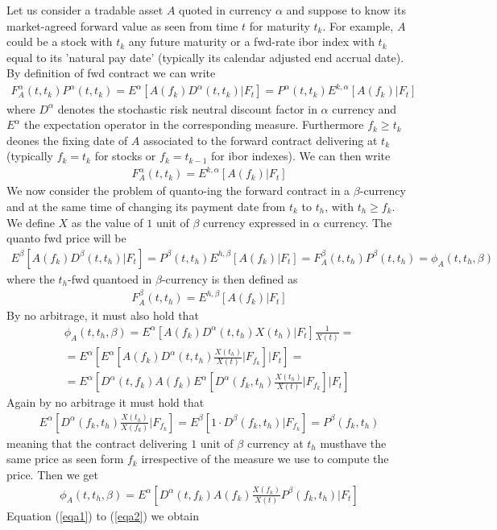 \documentclass[a4paper,10pt]{report}
\theoremstyle{plain}
\theoremstyle{definition}
\newcommand\be{\begin{eqnarray}}    %
\newcommand\ee{\end{eqnarray}}
\begin{document}
Let us consider a tradable asset $A$ quoted in currency $\alpha$ and suppose to know its market-agreed forward value as seen from time $t$ for maturity $t_k$. For example, $A$ could be a stock with $t_k$ any future maturity or a fwd-rate ibor index with $t_k$ equal to its 'natural pay date' (typically its calendar adjusted end accrual date). 
By definition of fwd contract we can write 
\be 
F_A^{\alpha}(t,t_k)P^{\alpha}(t,t_k) = E^{\alpha}\left[A(f_k) D^{\alpha}(t,t_k)| F_t\right]= P^{\alpha}(t,t_k) E^{k, \alpha}\left[A(f_k)| F_t\right]
\ee
where $D^{\alpha}$ denotes the stochastic risk neutral discount factor in $\alpha$ currency and $E^{\alpha}$ the expectation operator in the corresponding measure. 
Furthermore $f_k\ge t_k$ deones the fixing date of $A$ associated to the forward contract delivering at $t_k$ (typically $f_k=t_k$ for stocks or $f_k=t_{k-1}$ for ibor indexes). 
We can then write
\be 
F_A^{\alpha}(t,t_k) = E^{k, \alpha}\left[A(f_k)| F_t\right]
\ee
We now consider the problem of quanto-ing the forward contract in a $\beta$-currency and at the same time of changing its payment date from $t_k$ to $t_h$, with $t_h\ge f_k$. 
We define $X$ as the value of $1$ unit of $\beta$ currency expressed in $\alpha$ currency. The quanto fwd price will be
\be 
E^{\beta}\left[A(f_k) D^{\beta}(t,t_h)| F_t\right] =P^{\beta}(t,t_h) E^{h, \beta}\left[A(f_k)| F_t\right]=F_A^{\beta}(t,t_h)P^{\beta}(t,t_h)=\phi_A(t,t_h,\beta)
\label{eqa1}
\ee
where the $t_h$-fwd quantoed in $\beta$-currency is then defined as
\be 
F_A^{\beta}(t,t_h) = E^{h, \beta}\left[A(f_k)| F_t\right]
\ee
By no arbitrage, it must also hold that
\be 
\phi_A(t,t_h,\beta)=E^{\alpha}\left[A(f_k) D^{\alpha}(t,t_h) X(t_h) | F_t\right] \frac{1}{X(t)}=\\
= E^{\alpha}\left[E^{\alpha}\left[A(f_k) D^{\alpha}(t,t_h)\frac{X(t_h)}{X(t)} | F_{f_k}\right] | F_t\right] =\\
= E^{\alpha}\left[D^{\alpha}(t,f_k) A(f_k) E^{\alpha}\left[ D^{\alpha}(f_k,t_h)\frac{X(t_h)}{X(t)} | F_{f_k}\right] | F_t\right] 
\ee
Again by no arbitrage it must hold that
\be 
E^{\alpha}\left[ D^{\alpha}(f_k,t_h)\frac{X(t_h)}{X(f_k)} | F_{f_k}\right] =E^{\beta}\left[ 1 \cdot D^{\beta}(f_k,t_h) | F_{f_k}\right] = P^{\beta}(f_k,t_h)
\ee
meaning that the contract delivering $1$ unit of $\beta$ currency at $t_h$ musthave the same price as seen form $f_k$ irrespective of the measure we use to compute the price.
Then we get
\be 
\phi_A(t,t_h,\beta)=E^{\alpha}\left[D^{\alpha}(t,f_k) A(f_k)  \frac{X(f_k)}{X(t)}  P^{\beta}(f_k,t_h) | F_t\right] 
\label{eqa2}
\ee
Equation (\ref{eqa1}) to (\ref{eqa2}) we obtain
\end{document}
